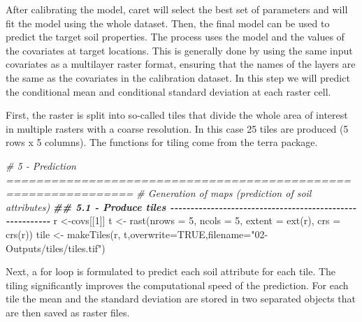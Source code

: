 \documentclass[
  10pt,
  b5paper,
  oneside]{book}
\newenvironment{Shaded}{\begin{snugshade}}{\end{snugshade}}
\newcommand{\AttributeTok}[1]{\textcolor[rgb]{0.77,0.63,0.00}{#1}}
\newcommand{\CommentTok}[1]{\textcolor[rgb]{0.56,0.35,0.01}{\textit{#1}}}
\newcommand{\ConstantTok}[1]{\textcolor[rgb]{0.00,0.00,0.00}{#1}}
\newcommand{\DecValTok}[1]{\textcolor[rgb]{0.00,0.00,0.81}{#1}}
\newcommand{\DocumentationTok}[1]{\textcolor[rgb]{0.56,0.35,0.01}{\textbf{\textit{#1}}}}
\newcommand{\FunctionTok}[1]{\textcolor[rgb]{0.00,0.00,0.00}{#1}}
\newcommand{\NormalTok}[1]{#1}
\newcommand{\OtherTok}[1]{\textcolor[rgb]{0.56,0.35,0.01}{#1}}
\newcommand{\StringTok}[1]{\textcolor[rgb]{0.31,0.60,0.02}{#1}}
\begin{document}
After calibrating the model, caret will select the best set of parameters and will fit the model using the whole dataset. Then, the final model can be used to predict the target soil properties. The process uses the model and the values of the covariates at target locations. This is generally done by using the same input covariates as a multilayer raster format, ensuring that the names of the layers are the same as the covariates in the calibration dataset. In this step we will predict the conditional mean and conditional standard deviation at each raster cell.

First, the raster is split into so-called tiles that divide the whole area of interest in multiple rasters with a coarse resolution. In this case 25 tiles are produced (5 rows x 5 columns). The functions for tiling come from the terra package.

\begin{Shaded}
\begin{Highlighting}[]
\CommentTok{\# 5 {-} Prediction ===============================================================}
\CommentTok{\# Generation of maps (prediction of soil attributes) }
\DocumentationTok{\#\# 5.1 {-} Produce tiles {-}{-}{-}{-}{-}{-}{-}{-}{-}{-}{-}{-}{-}{-}{-}{-}{-}{-}{-}{-}{-}{-}{-}{-}{-}{-}{-}{-}{-}{-}{-}{-}{-}{-}{-}{-}{-}{-}{-}{-}{-}{-}{-}{-}{-}{-}{-}{-}{-}{-}{-}{-}{-}{-}{-}{-}{-}}
\NormalTok{r }\OtherTok{\textless{}{-}}\NormalTok{covs[[}\DecValTok{1}\NormalTok{]]}
\NormalTok{t }\OtherTok{\textless{}{-}} \FunctionTok{rast}\NormalTok{(}\AttributeTok{nrows =} \DecValTok{5}\NormalTok{, }\AttributeTok{ncols =} \DecValTok{5}\NormalTok{, }\AttributeTok{extent =} \FunctionTok{ext}\NormalTok{(r), }\AttributeTok{crs =} \FunctionTok{crs}\NormalTok{(r))}
\NormalTok{tile }\OtherTok{\textless{}{-}} \FunctionTok{makeTiles}\NormalTok{(r, t,}\AttributeTok{overwrite=}\ConstantTok{TRUE}\NormalTok{,}\AttributeTok{filename=}\StringTok{"02{-}Outputs/tiles/tiles.tif"}\NormalTok{)}
\end{Highlighting}
\end{Shaded}

Next, a for loop is formulated to predict each soil attribute for each tile. The tiling significantly improves the computational speed of the prediction. For each tile the mean and the standard deviation are stored in two separated objects that are then saved as raster files.
\end{document}
